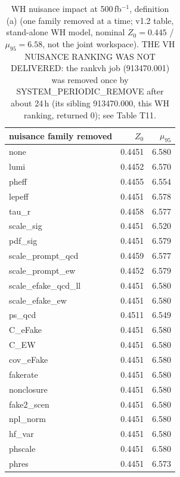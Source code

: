 \begin{table}[ht]\centering\small
\begin{tabular}{lrr}\hline
nuisance family removed & $Z_0$ & $\mu_{95}$ \\\hline
none & 0.4451 & 6.580 \\
lumi & 0.4452 & 6.570 \\
pheff & 0.4455 & 6.554 \\
lepeff & 0.4451 & 6.578 \\
tau\_r & 0.4458 & 6.577 \\
scale\_sig & 0.4451 & 6.520 \\
pdf\_sig & 0.4451 & 6.579 \\
scale\_prompt\_qcd & 0.4459 & 6.577 \\
scale\_prompt\_ew & 0.4452 & 6.579 \\
scale\_efake\_qcd\_ll & 0.4451 & 6.580 \\
scale\_efake\_ew & 0.4451 & 6.580 \\
ps\_qcd & 0.4511 & 6.549 \\
C\_eFake & 0.4451 & 6.580 \\
C\_EW & 0.4451 & 6.580 \\
cov\_eFake & 0.4451 & 6.580 \\
fakerate & 0.4451 & 6.580 \\
nonclosure & 0.4451 & 6.580 \\
fake2\_scen & 0.4451 & 6.580 \\
npl\_norm & 0.4451 & 6.580 \\
hf\_var & 0.4451 & 6.580 \\
phscale & 0.4451 & 6.580 \\
phres & 0.4451 & 6.573 \\\hline
\end{tabular}
\caption{WH nuisance impact at 500\,fb$^{-1}$, definition (a) (one family removed at a time; v1.2 table, stand-alone WH model, nominal $Z_0=0.445$ / $\mu_{95}=6.58$, not the joint workspace). THE VH NUISANCE RANKING WAS NOT DELIVERED: the rankvh job (913470.001) was removed once by SYSTEM\_PERIODIC\_REMOVE after about 24\,h (its sibling 913470.000, this WH ranking, returned 0); see Table T11.}
\end{table}
